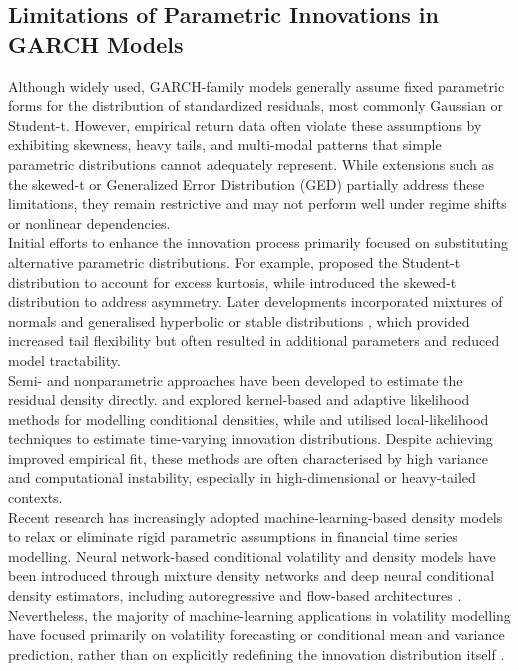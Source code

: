 \documentclass[oneside,12pt]{CUEDthesisPSnPDF}
\newcommand{\textcite}{\citet}
\newcommand{\parencite}{\citep}
\begin{document}
\subsection{Limitations of Parametric Innovations in GARCH Models}
\noindent 
Although widely used, GARCH-family models generally assume fixed parametric forms for the distribution of standardized residuals, most commonly Gaussian or Student-t. However, empirical return data often violate these assumptions by exhibiting skewness, heavy tails, and multi-modal patterns that simple parametric distributions cannot adequately represent. While extensions such as the skewed-t \parencite{hansen1994autoregressive,fernandez1998multivariate} or Generalized Error Distribution (GED) \parencite{nelson1991conditional} partially address these limitations, they remain restrictive and may not perform well under regime shifts or nonlinear dependencies.\\

Initial efforts to enhance the innovation process primarily focused on substituting alternative parametric distributions. For example, \textcite{bollerslev1987conditionally} proposed the Student-t distribution to account for excess kurtosis, while \textcite{hansen1994autoregressive} introduced the skewed-t distribution to address asymmetry. Later developments incorporated mixtures of normals \parencite{hu2005semiparametric} and generalised hyperbolic or stable distributions \parencite{mcneil2000estimation,bauwens2006multivariate}, which provided increased tail flexibility but often resulted in additional parameters and reduced model tractability.\\

Semi- and nonparametric approaches have been developed to estimate the residual density directly. \textcite{engle1993measuring} and \textcite{ghysels1996filtering} explored kernel-based and adaptive likelihood methods for modelling conditional densities, while \textcite{jones2003nonparametric} and \textcite{hansen2004nonparametric} utilised local-likelihood techniques to estimate time-varying innovation distributions. Despite achieving improved empirical fit, these methods are often characterised by high variance and computational instability, especially in high-dimensional or heavy-tailed contexts.\\

Recent research has increasingly adopted machine-learning-based density models to relax or eliminate rigid parametric assumptions in financial time series modelling. Neural network-based conditional volatility and density models have been introduced through mixture density networks \parencite{bishop1994mixture} and deep neural conditional density estimators, including autoregressive and flow-based architectures \parencite{papamakarios2017masked,papamakarios2021normalizing}. Nevertheless, the majority of machine-learning applications in volatility modelling have focused primarily on volatility forecasting or conditional mean and variance prediction, rather than on explicitly redefining the innovation distribution itself \parencite{bao2017deep}. \\
\end{document}
